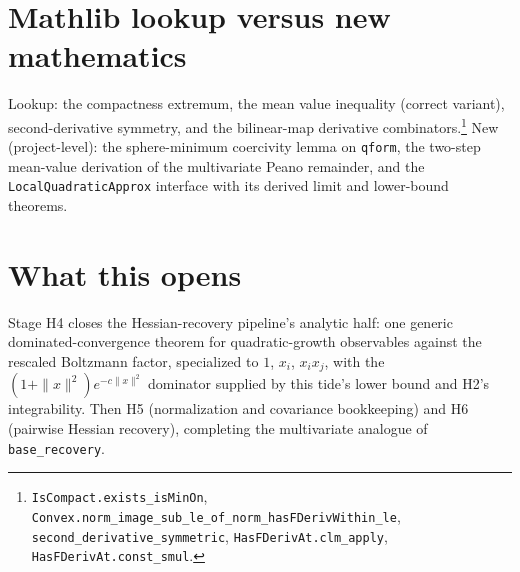 \documentclass[11pt]{article}
\begin{document}
\section{Mathlib lookup versus new mathematics}

Lookup: the compactness extremum, the mean value inequality (correct
variant), second-derivative symmetry, and the bilinear-map derivative
combinators.\footnote{\texttt{IsCompact.exists\_isMinOn},
\texttt{Convex.norm\_image\_sub\_le\_of\_norm\_hasFDerivWithin\_le},
\texttt{second\_derivative\_symmetric},
\texttt{HasFDerivAt.clm\_apply}, \texttt{HasFDerivAt.const\_smul}.}
New (project-level): the sphere-minimum coercivity lemma on
\texttt{qform}, the two-step mean-value derivation of the
multivariate Peano remainder, and the \texttt{LocalQuadraticApprox}
interface with its derived limit and lower-bound theorems.

\section{What this opens}

Stage H4 closes the Hessian-recovery pipeline's analytic half: one
generic dominated-convergence theorem for quadratic-growth
observables against the rescaled Boltzmann factor, specialized to
$1$, $x_i$, $x_i x_j$, with the $(1+\|x\|^2)e^{-c\|x\|^2}$ dominator
supplied by this tide's lower bound and H2's integrability. Then H5
(normalization and covariance bookkeeping) and H6 (pairwise Hessian
recovery), completing the multivariate analogue of
\texttt{base\_recovery}.
\end{document}
